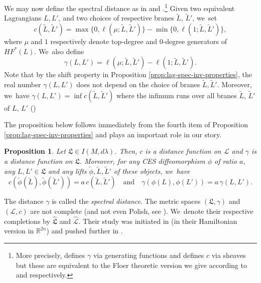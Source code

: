 \documentclass[10pt]{amsart}
\newtheorem{prop}[thm]{Proposition}
\theoremstyle{definition}
\newcommand {\LL}{{\mathcal L}}
\newcommand{\R}{\mathbb{R}}
\newcommand{\fL}{\mathfrak {L}}
\newcommand{\hatL}{\widehat{\fL}}
\newcommand{\hatLL}{\widehat{\LL}}
\begin{document}
We may now define the spectral distance as in \cite{Viterbo-STAGGF} and \cite{Viterbo-gammas}.\footnote{More precisely, \cite{Viterbo-STAGGF} defines $\gamma$ via generating functions and \cite{Viterbo-gammas} defines $c$ via sheaves but these are equivalent to the Floer theoretic version we give according to \cite{Milinkovic-Oh} and \cite{Viterbo-Sheaves} respectively.}
Given two equivalent Lagrangians $L, L'$, and two choices of respective branes $\tilde L$, $\tilde L'$, we~set
\begin{equation*}
c(\tilde L,\tilde L')=\max\{0, \ell(\mu; \tilde L, \tilde L')\}- \min \{0,\ell(1; \tilde L,\tilde L')\},
\end{equation*}
where $\mu$ and $1$ respectively denote top-degree and $0$-degree generators of $HF^*(L)$. We~also define
\begin{equation*}
\gamma(L,L')=\ell(\mu; \tilde L, \tilde L')-\ell(1; \tilde L,\tilde L').
\end{equation*}
Note that by the shift property in Proposition \ref{prop:lag-spec-inv-properties}, the real number $\gamma(L,L')$ does not depend on the choice of branes $\tilde L, \tilde L'$. Moreover, we~have $\gamma(L, L')=\inf c(\tilde L, \tilde L')$ where the infimum runs over all branes $\tilde L$, $\tilde L'$ of $L$, $L'$ (\cite[Prop.\,5.2]{Viterbo-gammas})

The proposition below follows immediately from the fourth item of Proposition \ref{prop:lag-spec-inv-properties} and plays an important role in our story.

\begin{prop}\label{prop:gamma} Let $\fL\in I(M, d\lambda)$. Then, $c$ is a distance function on $\LL$ and $\gamma$ is a distance function on $\fL$. Moreover, for any CES diffeomorphism $\phi$ of ratio $a$, any $L, L'\in\fL$ and any lifts $\tilde \phi, \tilde L, \tilde L'$ of these objects, we~have
\begin{equation*}
c(\tilde \phi (\tilde L), \tilde \phi(\tilde L'))=a\, c(\tilde L,\tilde L')\quad \text{and}\quad \gamma(\phi(L), \phi(L'))=a\,\gamma(L, L').
\end{equation*}
\end{prop}

The distance $\gamma$ is called the \emph{spectral distance}. The metric spaces $(\fL,\gamma)$ and $(\LL,c)$ are not complete (and not even Polish, see \cite[Prop.\,A.1]{Viterbo-gammas}). We~denote their respective completions by $\hatL$ and $\hatLL$. Their study was initiated in \cite{Humiliere-completion} (in their Hamiltonian version in $\R^{2n}$) and pushed further in \cite{Viterbo-gammas}.
\end{document}
